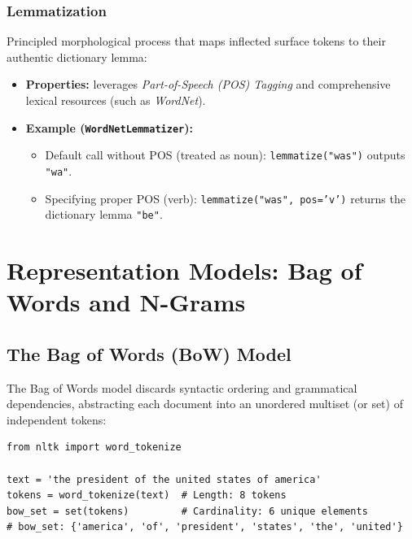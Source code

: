 \subsubsection{Lemmatization}
Principled morphological process that maps inflected surface tokens to their authentic dictionary lemma:
\begin{itemize}
    \item \textbf{Properties:} leverages \textit{Part-of-Speech (POS) Tagging} and comprehensive lexical resources (such as \textit{WordNet}).
    \item \textbf{Example (\texttt{WordNetLemmatizer}):}
    \begin{itemize}
        \item Default call without POS (treated as noun): \texttt{lemmatize("was")} outputs \texttt{"wa"}.
        \item Specifying proper POS (verb): \texttt{lemmatize("was", pos='v')} returns the dictionary lemma \texttt{"be"}.
    \end{itemize}
\end{itemize}

\FloatBarrier
\section{Representation Models: Bag of Words and N-Grams}
\label{sec:bow-ngrams-en}

\subsection{The Bag of Words (BoW) Model}
The Bag of Words model discards syntactic ordering and grammatical dependencies, abstracting each document into an unordered multiset (or set) of independent tokens:

\begin{lstlisting}[style=pythoncode,caption={Basic set-based text representation.}]
from nltk import word_tokenize

text = 'the president of the united states of america'
tokens = word_tokenize(text)  # Length: 8 tokens
bow_set = set(tokens)         # Cardinality: 6 unique elements
# bow_set: {'america', 'of', 'president', 'states', 'the', 'united'}
\end{lstlisting}

